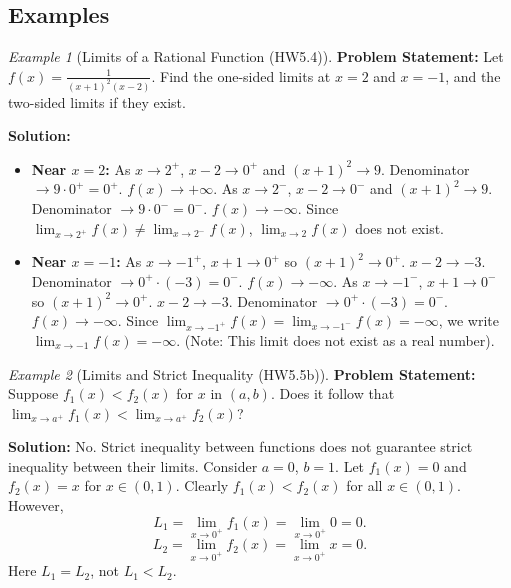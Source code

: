 \documentclass{article}
\theoremstyle{definition}
\theoremstyle{plain}
\theoremstyle{remark}
\newtheorem{example}{Example}[section]
\begin{document}
\subsection{Examples}

\begin{example}[Limits of a Rational Function (HW5.4)]
\textbf{Problem Statement:} Let \(f(x) = \frac{1}{(x+1)^2 (x-2)}\). Find the one-sided limits at \(x=2\) and \(x=-1\), and the two-sided limits if they exist.

\textbf{Solution:}
\begin{itemize}
    \item \textbf{Near \(x=2\):}
        As \(x \to 2^+\), \(x-2 \to 0^+\) and \((x+1)^2 \to 9\). Denominator \(\to 9 \cdot 0^+ = 0^+\). \(f(x) \to +\infty\).
        As \(x \to 2^-\), \(x-2 \to 0^-\) and \((x+1)^2 \to 9\). Denominator \(\to 9 \cdot 0^- = 0^-\). \(f(x) \to -\infty\).
        Since \(\lim_{x\to 2^+} f(x) \ne \lim_{x\to 2^-} f(x)\), \(\lim_{x\to 2} f(x)\) does not exist.
    \item \textbf{Near \(x=-1\):}
        As \(x \to -1^+\), \(x+1 \to 0^+\) so \((x+1)^2 \to 0^+\). \(x-2 \to -3\). Denominator \(\to 0^+ \cdot (-3) = 0^-\). \(f(x) \to -\infty\).
        As \(x \to -1^-\), \(x+1 \to 0^-\) so \((x+1)^2 \to 0^+\). \(x-2 \to -3\). Denominator \(\to 0^+ \cdot (-3) = 0^-\). \(f(x) \to -\infty\).
        Since \(\lim_{x\to -1^+} f(x) = \lim_{x\to -1^-} f(x) = -\infty\), we write \(\lim_{x\to -1} f(x) = -\infty\). (Note: This limit does not exist as a real number).
\end{itemize}
\end{example}

\begin{example}[Limits and Strict Inequality (HW5.5b)]
\textbf{Problem Statement:} Suppose \(f_1(x) < f_2(x)\) for \(x\) in \((a,b)\). Does it follow that \(\lim_{x\to a^+} f_1(x) < \lim_{x\to a^+} f_2(x)\)?

\textbf{Solution:} No. Strict inequality between functions does not guarantee strict inequality between their limits.
Consider \(a=0\), \(b=1\). Let \(f_1(x) = 0\) and \(f_2(x) = x\) for \(x \in (0, 1)\).
Clearly \(f_1(x) < f_2(x)\) for all \(x \in (0, 1)\).
However,
\[ L_1 = \lim_{x\to 0^+} f_1(x) = \lim_{x\to 0^+} 0 = 0. \]
\[ L_2 = \lim_{x\to 0^+} f_2(x) = \lim_{x\to 0^+} x = 0. \]
Here \(L_1 = L_2\), not \(L_1 < L_2\).
\end{example}
\end{document}
